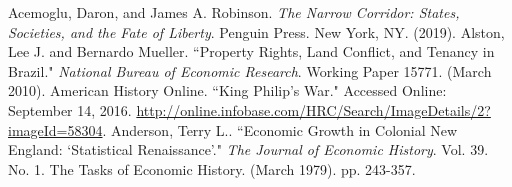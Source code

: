 \documentclass[sn-mathphys]{sn-jnl}%
\theoremstyle{thmstyleone}%
\theoremstyle{thmstyletwo}%
\theoremstyle{thmstylethree}%
\begin{document}

\begin{thebibliography}{1}

{} Acemoglu, Daron, and James A. Robinson. {\em The Narrow Corridor: States, Societies, and the Fate of Liberty}. Penguin Press. New York, NY. (2019).
\smallskip
{} Alston, Lee J. and Bernardo Mueller. ``Property Rights, Land Conflict, and Tenancy in Brazil."  {\em National Bureau of Economic Research}. Working Paper 15771. (March 2010).
\smallskip
{} American History Online. ``King Philip's War."  Accessed Online: September 14, 2016. \url{http://online.infobase.com/HRC/Search/ImageDetails/2?imageId=58304}.
\smallskip
{} Anderson, Terry L.. ``Economic Growth in Colonial New England: `Statistical Renaissance'."  {\em The Journal of Economic History}. Vol. 39. No. 1. The Tasks of Economic History. (March 1979). pp. 243-357.
\smallskip


\end{thebibliography}
\end{document}
